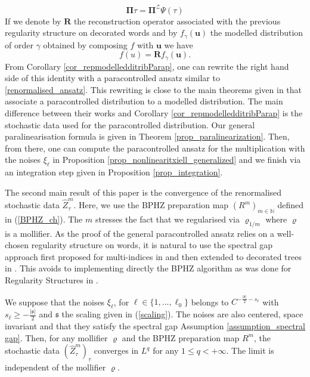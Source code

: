 \documentclass[11pt]{preprint}
\def\s{\mathfrak{s}}
\newcounter{theorem}
\def\PPi{\boldsymbol{\Pi}}
\def\eqref#1{(\ref{#1})}
\begin{document}
\begin{equation*}
	\PPi \tau = \PPi^{\mathcal{Z}} \Psi(\tau)
\end{equation*} 
If we denote by ${\bm R}$ the reconstruction operator associated with the previous regularity structure on decorated words and by $ f_{\gamma}(\bm u)$ the modelled distribution of order $\gamma$ obtained by composing $f$ with $\bm u$ we have
\begin{equation*}
f(u)= 	{\bm R}{f_{\gamma}(\bm u)}.
\end{equation*}
From Corollary \ref{cor_repmodelledditribParap}, one can rewrite the right hand side of this identity with a paracontrolled ansatz similar to \ref{renormalised_ansatz}. This rewriting is close to the main theorems given in \cite{BailleulHoshinoRS1,PCandRS2} that associate a paracontrolled distribution to a modelled distribution.  The main difference between their works and Corollary \ref{cor_repmodelledditribParap} is the stochastic data used for the paracontrolled distribution.
Our general paralinearisation formula is given in Theorem \ref{prop_paralinearization}. Then, from there, one can compute the paracontrolled ansatz  for the multiplication with the noises $ \xi_{\ell}$ in Proposition \ref{prop_nonlinearitxiell_generalized} and we finish via an integration step given in Proposition \ref{prop_integration}.

The second main result of this paper is the convergence of the renormalised stochastic data $\widehat{Z}_{\tau}^m$. Here, we use the BPHZ preparation map $(R^m)_{m \in \mathbb{N}}$ defined in \eqref{BPHZ_ch}. The $m$ stresses the fact that we regularised via $\varrho_{1/m}$ where $\varrho $ is a mollifier. 
	As the proof of the general paracontrolled ansatz relies on a well-chosen regularity structure on words, it is natural to use the spectral gap approach first proposed for multi-indices in \cite{LOTP} and then extended to decorated trees in \cite{HS23,Hos25,BH23}. This avoids to
 implementing directly the BPHZ algorithm \cite{BP57,KH69,WZ69} as was done for Regularity Structures in \cite{CH16}.  
 
\begin{theorem}\label{main_convergence}
We suppose that the noises $ \xi_\ell $, for $ \ell \in \{1,...,\ell_0\} $ belongs to $ C^{-\frac{|\mathfrak{s}|}{2} - s_\ell} $ with $ s_{\ell} \geq - \frac{|\mathfrak{s}|}{2} $ and $\s$ the scaling given in \eqref{scaling}. The noises are also centered, space invariant and that they satisfy the spectral gap Assumption \ref{assumption_spectral gap}. Then, for any mollifier $\varrho$ and the BPHZ preparation map $R^m$, the stochastic data $ (\widehat{Z}_{\tau}^m)_{\tau} $ converges in $L^q$ for any $ 1 \leq q < + \infty $. The limit is independent of the mollifier $\varrho$.
	\end{theorem}
	
\end{document}
